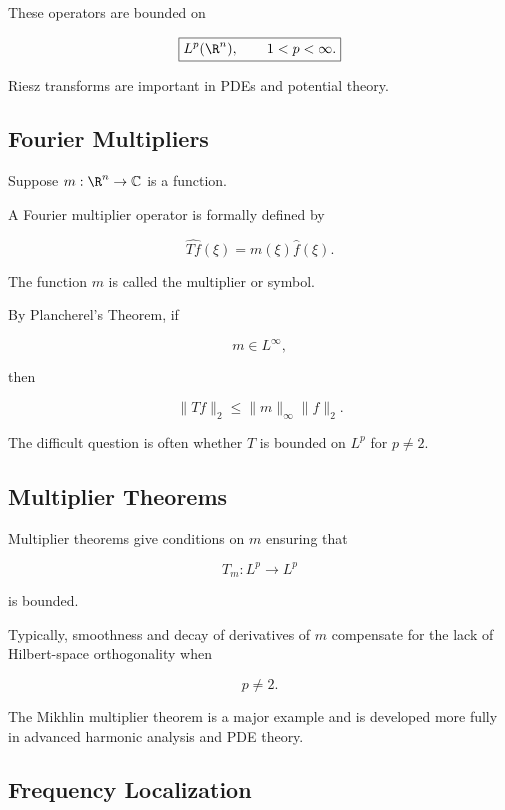 These operators are bounded on

\[
\boxed{
L^p(\R^n),
\qquad
1<p<\infty.
}
\]

Riesz transforms are important in PDEs and potential theory.

\subsection{Fourier Multipliers}
\label{subsec:fourier-multipliers}

Suppose \(m:\R^n\to\mathbb{C}\) is a function.

A Fourier multiplier operator is formally defined by

\[
\boxed{
\widehat{Tf}(\xi)
=
m(\xi)\widehat{f}(\xi).
}
\]

The function \(m\) is called the multiplier or symbol.

By Plancherel's Theorem, if

\[
m\in L^\infty,
\]

then

\[
\boxed{
\|Tf\|_2
\leq
\|m\|_\infty\|f\|_2.
}
\]

The difficult question is often whether \(T\) is bounded on \(L^p\) for
\(p\neq2\).

\subsection{Multiplier Theorems}
\label{subsec:multiplier-theorems}

Multiplier theorems give conditions on \(m\) ensuring that

\[
\boxed{
T_m:L^p\to L^p
}
\]

is bounded.

Typically, smoothness and decay of derivatives of \(m\) compensate for
the lack of Hilbert-space orthogonality when

\[
p\neq2.
\]

The Mikhlin multiplier theorem is a major example and is developed more
fully in advanced harmonic analysis and PDE theory.

\subsection{Frequency Localization}
\label{subsec:frequency-localization}

